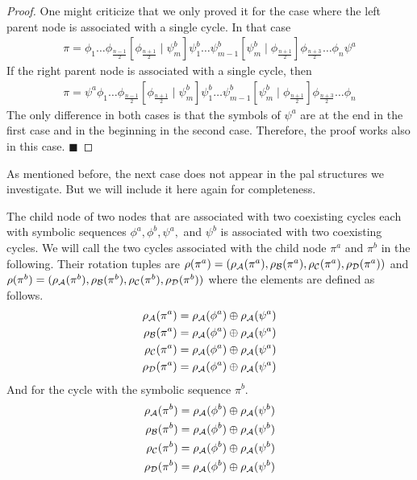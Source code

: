 \begin{proof}
	One might criticize that we only proved it for the case where the left parent node is associated with a single cycle.
	In that case
	\begin{align*}
		\pi = \phi_1 \dots \phi_{\frac{n-1}{2}} \left[\phi_{\frac{n+1}{2}} \mid \psi^b_m\right] \psi^b_1 \dots \psi^b_{m-1} \left[\psi^b_m \mid \phi_{\frac{n+1}{2}}\right] \phi_{\frac{n+3}{2}} \dots \phi_n \psi^a
	\end{align*}
	If the right parent node is associated with a single cycle, then
	\begin{align*}
		\pi = \psi^a \phi_1 \dots \phi_{\frac{n-1}{2}} \left[\phi_{\frac{n+1}{2}} \mid \psi^b_m\right] \psi^b_1 \dots \psi^b_{m-1} \left[\psi^b_m \mid \phi_{\frac{n+1}{2}}\right] \phi_{\frac{n+3}{2}} \dots \phi_n
	\end{align*}
	The only difference in both cases is that the symbols of $\psi^a$ are at the end in the first case and in the beginning in the second case.
	Therefore, the proof works also in this case.
	\hfill $\blacksquare$
\end{proof}

As mentioned before, the next case does not appear in the \gls{pal} structures we investigate.
But we will include it here again for completeness.

\begin{theorem}
	The child node of two nodes that are associated with two coexisting cycles each with symbolic sequences $\phi^a, \phi^b, \psi^a,$ and $\psi^b$ is associated with two coexisting cycles.
	We will call the two cycles associated with the child node $\pi^a$ and $\pi^b$ in the following.
	Their rotation tuples are $\rho(\pi^a) = (\rho_{\mathcal{A}}(\pi^a), \rho_{\mathcal{B}}(\pi^a), \rho_{\mathcal{C}}(\pi^a), \rho_{\mathcal{D}}(\pi^a))$ and $\rho(\pi^b) = (\rho_{\mathcal{A}}(\pi^b), \rho_{\mathcal{B}}(\pi^b), \rho_{\mathcal{C}}(\pi^b), \rho_{\mathcal{D}}(\pi^b))$ where the elements are defined as follows.
	\begin{subequations}
		\begin{align}
			\rho_{\mathcal{A}}(\pi^a) & = \rho_{\mathcal{A}}(\phi^a) \oplus \rho_{\mathcal{A}}(\psi^a) \\
			\rho_{\mathcal{B}}(\pi^a) & = \rho_{\mathcal{A}}(\phi^a) \oplus \rho_{\mathcal{A}}(\psi^a) \\
			\rho_{\mathcal{C}}(\pi^a) & = \rho_{\mathcal{A}}(\phi^a) \oplus \rho_{\mathcal{A}}(\psi^a) \\
			\rho_{\mathcal{D}}(\pi^a) & = \rho_{\mathcal{A}}(\phi^a) \oplus \rho_{\mathcal{A}}(\psi^a)
		\end{align}
	\end{subequations}
	And for the cycle with the symbolic sequence $\pi^b$.
	\begin{subequations}
		\begin{align}
			\rho_{\mathcal{A}}(\pi^b) & = \rho_{\mathcal{A}}(\phi^b) \oplus \rho_{\mathcal{A}}(\psi^b) \\
			\rho_{\mathcal{B}}(\pi^b) & = \rho_{\mathcal{A}}(\phi^b) \oplus \rho_{\mathcal{A}}(\psi^b) \\
			\rho_{\mathcal{C}}(\pi^b) & = \rho_{\mathcal{A}}(\phi^b) \oplus \rho_{\mathcal{A}}(\psi^b) \\
			\rho_{\mathcal{D}}(\pi^b) & = \rho_{\mathcal{A}}(\phi^b) \oplus \rho_{\mathcal{A}}(\psi^b)
		\end{align}
	\end{subequations}
\end{theorem}

